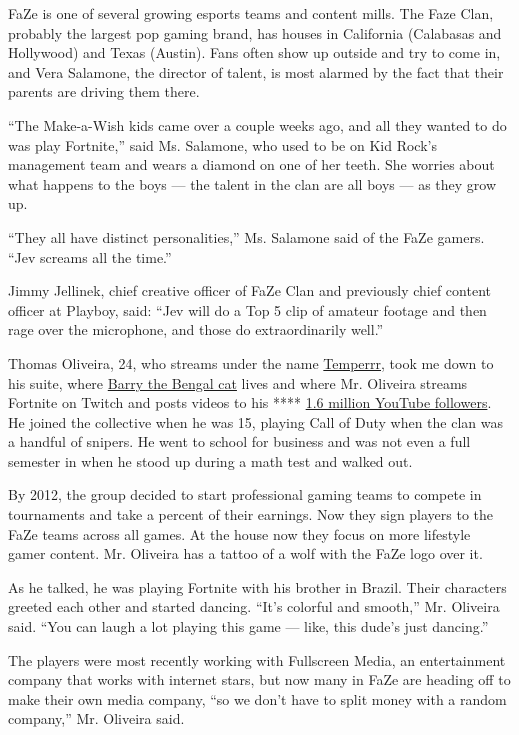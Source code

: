 FaZe is one of several growing esports teams and content mills. The Faze
Clan, probably the largest pop gaming brand, has houses in California
(Calabasas and Hollywood) and Texas (Austin). Fans often show up outside
and try to come in, and Vera Salamone, the director of talent, is most
alarmed by the fact that their parents are driving them there.

``The Make-a-Wish kids came over a couple weeks ago, and all they wanted
to do was play Fortnite,'' said Ms. Salamone, who used to be on Kid
Rock's management team and wears a diamond on one of her teeth. She
worries about what happens to the boys --- the talent in the clan are
all boys --- as they grow up.

``They all have distinct personalities,'' Ms. Salamone said of the FaZe
gamers. ``Jev screams all the time.''

Jimmy Jellinek, chief creative officer of FaZe Clan and previously chief
content officer at Playboy, said: ``Jev will do a Top 5 clip of amateur
footage and then rage over the microphone, and those do extraordinarily
well.''

Thomas Oliveira, 24, who streams under the name
\href{https://www.twitch.tv/temperrr}{Temperrr}, took me down to his
suite, where \href{https://www.instagram.com/fazebarry/?hl=en}{Barry the
Bengal cat} lives and where Mr. Oliveira streams Fortnite on Twitch and
posts videos to his ****
\href{https://www.youtube.com/channel/UCD1eUqFkdQIu29iLdXkQ8BQ}{1.6
million YouTube followers}. He joined the collective when he was 15,
playing Call of Duty when the clan was a handful of snipers. He went to
school for business and was not even a full semester in when he stood up
during a math test and walked out.

By 2012, the group decided to start professional gaming teams to compete
in tournaments and take a percent of their earnings. Now they sign
players to the FaZe teams across all games. At the house now they focus
on more lifestyle gamer content. Mr. Oliveira has a tattoo of a wolf
with the FaZe logo over it.

As he talked, he was playing Fortnite with his brother in Brazil. Their
characters greeted each other and started dancing. ``It's colorful and
smooth,'' Mr. Oliveira said. ``You can laugh a lot playing this game ---
like, this dude's just dancing.''

The players were most recently working with Fullscreen Media, an
entertainment company that works with internet stars, but now many in
FaZe are heading off to make their own media company, ``so we don't have
to split money with a random company,'' Mr. Oliveira said.

